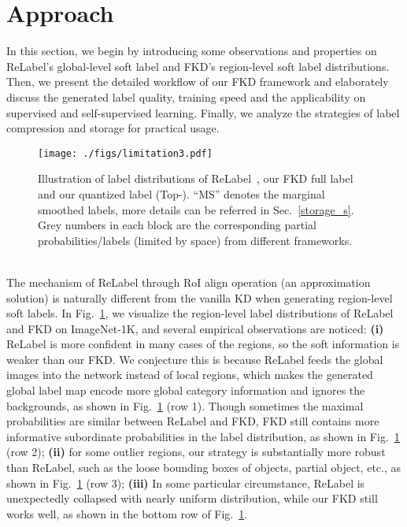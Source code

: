 \documentclass[10pt,twocolumn,letterpaper]{article}
\begin{document}
\vspace{-0.06in}
\section{Approach} \label{approach_ana}
\vspace{-0.03in}

In this section, we begin by introducing some observations and properties on ReLabel's global-level soft label and FKD's region-level soft label distributions. Then, we present the detailed workflow of our FKD framework and elaborately discuss the generated label quality, training speed and the applicability on supervised and self-supervised learning. Finally, we analyze the strategies of label compression and storage for practical usage.


\begin{figure}[t]
  \centering
  \texttt{[image: ./figs/limitation3.pdf]}
  \vspace{-0.13in}
  \caption{Illustration of label distributions of ReLabel~\cite{yun2021re}, our FKD full label and our quantized label (Top-). ``MS'' denotes the marginal smoothed labels, more details can be referred in Sec.~\ref{storage_s}. Grey numbers in each block are the corresponding partial probabilities/labels (limited by space) from different frameworks.} 
  \label{fig:dis_label_comparison}
  \vspace{-0.14in}
\end{figure}

\\
The mechanism of ReLabel through RoI align operation (an approximation solution) is naturally different from the vanilla KD when generating region-level soft labels. In Fig.~\ref{fig:dis_label_comparison}, we visualize the region-level label distributions of ReLabel and FKD on ImageNet-1K, and several empirical observations are noticed: {\bf(i)} ReLabel is more confident in many cases of the regions, so the soft information is weaker than our FKD. We conjecture this is because ReLabel feeds the global images into the network instead of local regions, which makes the generated global label map encode more global category information and ignores the backgrounds, as shown in Fig.~\ref{fig:dis_label_comparison} (row 1). Though sometimes the maximal probabilities are similar between ReLabel and FKD, FKD still contains more informative subordinate probabilities in the label distribution, as shown in Fig.~\ref{fig:dis_label_comparison} (row 2); {\bf(ii)} for some outlier regions, our strategy is substantially more robust than ReLabel, such as the loose bounding boxes of objects, partial object, etc., as shown in Fig.~\ref{fig:dis_label_comparison} (row 3);  {\bf(iii)} In some particular circumstance, ReLabel is unexpectedly collapsed with nearly uniform distribution, while our FKD still works well, as shown in the bottom row of Fig.~\ref{fig:dis_label_comparison}.
\end{document}
